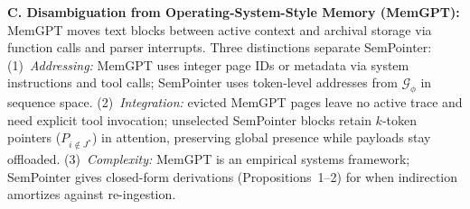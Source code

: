 \documentclass[runningheads]{llncs}
\begin{document}
{\noindent\textbf{C. Disambiguation from Operating-System-Style Memory (MemGPT):}
MemGPT \cite{packer2023memgpt} moves text blocks between active context and archival storage via function calls and parser interrupts. Three distinctions separate SemPointer: (1)~\emph{Addressing:} MemGPT uses integer page IDs or metadata via system instructions and tool calls; SemPointer uses token-level addresses from $\mathcal{G}_\phi$ in sequence space. (2)~\emph{Integration:} evicted MemGPT pages leave no active trace and need explicit tool invocation; unselected SemPointer blocks retain $k$-token pointers ($P_{i \notin J^*}$) in attention, preserving global presence while payloads stay offloaded. (3)~\emph{Complexity:} MemGPT is an empirical systems framework; SemPointer gives closed-form derivations (Propositions~1--2) for when indirection amortizes against re-ingestion.

}
\end{document}
